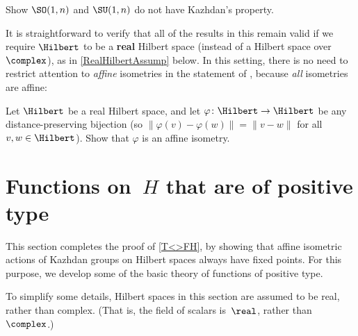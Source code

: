 \begin{exercises}
\item \label{SO1nNotKazhdan}
Show $\SO(1,n)$ and $\SU(1,n)$ do not have Kazhdan's property.

\item It is straightforward to verify that all of the results in this  remain valid if we require $\Hilbert$ to be a \textbf{real} Hilbert space (instead of a Hilbert space over~$\complex$), as in \cref{RealHilbertAssump} below. In this setting, there is no need to restrict attention to \emph{affine} isometries in the statement of , because \emph{all} isometries are affine:

Let $\Hilbert$ be a real Hilbert space, and let $\varphi \colon \Hilbert \to \Hilbert$ be any distance-preserving bijection (so $\| \varphi(v) - \varphi(w) \| = \| v - w \|$ for all $v,w \in \Hilbert$). Show that $\varphi$ is an affine isometry.

\end{exercises}



\section{Functions on\texorpdfstring{~$H$}{ H} that are of positive type} \label{PosDefFuncSect}

This section completes the proof of \cref{T<>FH}, by showing that affine isometric actions of Kazhdan groups on Hilbert spaces always have fixed points. For this purpose, we develop some of the basic theory of functions of positive type. 

\begin{assump} \label{RealHilbertAssump}
To simplify some details, Hilbert spaces in this section are assumed to be real, rather than complex. (That is, the field of scalars is~$\real$, rather than~$\complex$.)
\end{assump}


